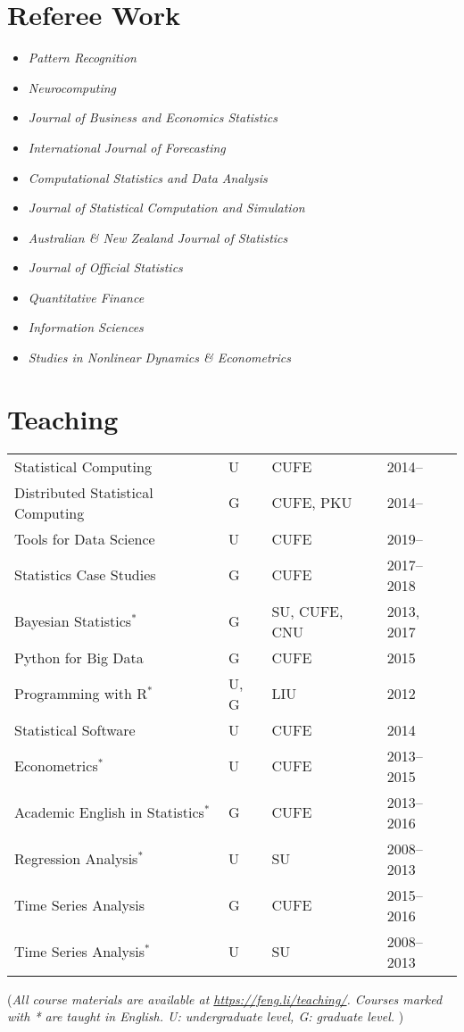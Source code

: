 \documentclass[twoside,a4paper,11pt]{amsart}
\begin{document}
\section*{Referee Work}
\begin{itemize}
\item \emph{Pattern Recognition}
\item \emph{Neurocomputing}
\item  \emph{Journal of Business and Economics Statistics}
\item  \emph{International Journal of Forecasting}
\item  \emph{Computational Statistics and Data Analysis}
\item  \emph{Journal of Statistical Computation and Simulation}
\item  \emph{Australian \& New Zealand Journal of Statistics}
\item  \emph{Journal of Official Statistics}
\item  \emph{Quantitative Finance}
\item  \emph{Information Sciences}
\item  \emph{Studies in Nonlinear Dynamics \& Econometrics}

\end{itemize}



\section*{Teaching}
\begin{center}
\begin{tabular}{p{6.5cm}lll}
  {Statistical Computing} & U& CUFE & 2014--\\
  {Distributed Statistical Computing} & G & CUFE, PKU& 2014--\\
  {Tools for Data Science} & U & CUFE & 2019--\\
  {Statistics Case Studies} & G & CUFE & 2017--2018\\
  {Bayesian Statistics}$^*$&G& SU, CUFE, CNU&2013, 2017\\
  {Python for Big Data} & G & CUFE & 2015\\
  {Programming with R}$^*$&U, G &LIU&  2012\\
  {Statistical Software}&U& CUFE& 2014\\
  {Econometrics}$^*$ & U&  CUFE& 2013--2015\\
  {Academic English in Statistics}$^*$&G&CUFE& 2013--2016\\
  {Regression Analysis}$^*$&U&SU&2008--2013\\
  {Time Series Analysis}& G & CUFE & 2015--2016\\
  {Time Series Analysis}$^*$&U&SU&2008--2013\\
\end{tabular}
\end{center}
{\footnotesize (\emph{All course materials are available at
    \emph{\url{https://feng.li/teaching/}}. Courses marked with * are taught in English. U: undergraduate level, G: graduate level. })}
\end{document}
